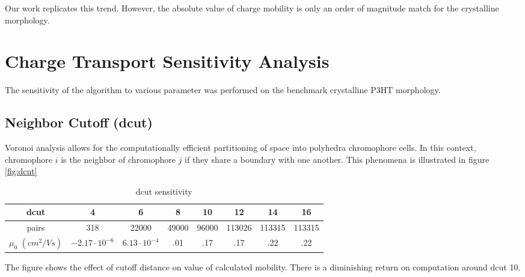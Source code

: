 Our work replicates this trend. However, the absolute value of charge mobility is only an order of magnitude
match for the crystalline morphology. 

\section{Charge Transport Sensitivity Analysis}
\label{transport}

The sensitivity of the algorithm to various parameter was performed on the benchmark crystalline P3HT
morphology.

\subsection{Neighbor Cutoff (dcut)}
\label{dcutresults}
Voronoi analysis allows for the computationally efficient partitioning of space into
polyhedra chromophore cells. In this context, chromophore $i$ is the neighbor of chromophore $j$ if they
share a boundary with one another.  
This phenomena is illustrated in figure \ref{fig:dcut} 

\begin{table}[ht]
\caption{dcut sensitivity}
\centering %
\begin{tabular}{c c c c c c c c} %
\hline\hline %
dcut & 4 & 6 & 8 & 10 & 12 & 14 & 16 \\ [0.5ex] %
\hline  %
pairs & 318 & 22000 & 49000 & 96000 & 113026 & 113315 & 113315 \\ [1ex]%
$\mu_{0}$ $(cm^{2}/Vs)$ & $-2.17 \cdot 10^{-6}$ & $6.13 \cdot 10^{-4}$ & .01 & .17 & .17 & .22 & .22 \\ [1ex] %
\hline %
\end{tabular}
\label{table:dcut-sense} %
\end{table}

The figure shows the effect of cutoff distance on value of
calculated mobility. There is a diminishing return on computation around dcut 10. 

